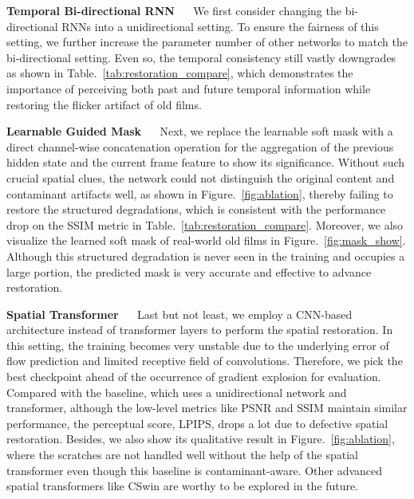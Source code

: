 \documentclass[10pt,twocolumn,letterpaper]{article}
\begin{document}
	\noindent\textbf{Temporal Bi-directional RNN} ~~ We first consider changing the bi-directional RNNs into a unidirectional setting. To ensure the fairness of this setting, we further increase the parameter number of other networks to match the bi-directional setting. Even so, the temporal consistency still vastly downgrades as shown in Table.~\ref{tab:restoration_compare}, which demonstrates the importance of perceiving both past and future temporal information while restoring the flicker artifact of old films. 
	
	\noindent\textbf{Learnable Guided Mask} ~~ Next, we replace the learnable soft mask with a direct channel-wise concatenation operation for the aggregation of the previous hidden state and the current frame feature to show its significance. Without such crucial spatial clues, the network could not distinguish the original content and contaminant artifacts well, as shown in Figure.~\ref{fig:ablation}, thereby failing to restore the structured degradations, which is consistent with the performance drop on the SSIM metric in Table.~\ref{tab:restoration_compare}. Moreover, we also visualize the learned soft mask of real-world old films in Figure.~\ref{fig:mask_show}. Although this structured degradation is never seen in the training and occupies a large portion, the predicted mask is very accurate and effective to advance restoration.
	
	\noindent\textbf{Spatial Transformer} ~~ Last but not least, we employ a CNN-based architecture instead of transformer layers to perform the spatial restoration. In this setting, the training becomes very unstable due to the underlying error of flow prediction and limited receptive field of convolutions. Therefore, we pick the best checkpoint ahead of the occurrence of gradient explosion for evaluation. Compared with the baseline, which uses a unidirectional network and transformer, although the low-level metrics like PSNR and SSIM maintain similar performance, the perceptual score, \ie LPIPS, drops a lot due to defective spatial restoration. Besides, we also show its qualitative result in  Figure.~\ref{fig:ablation}, where the scratches are not handled well without the help of the spatial transformer even though this baseline is contaminant-aware. Other advanced spatial transformers like CSwin\cite{dong2022cswin} are worthy to be explored in the future.
	
	
	
\end{document}
